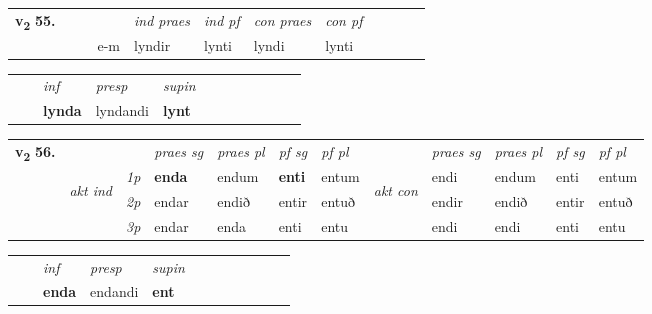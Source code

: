 \begin{tabular}{llllllllllll}\toprule
\multirow{4}{*}{{{\textbf{v{\textsubscript{2}}} \Large{\textbf{55.}}}}}  & &  & &  \textit{ind praes} & \textit{ind pf} & \textit{con praes} & \textit{con pf} \\*
&  & & e-m & lyndir & lynti & lyndi & lynti \\*
\cmidrule{5-9}
\end{tabular}


\begin{tabular}{llllllllllll}
 & & \textit{inf}     & \textit{presp} & \textit{supin}       \\*
  & & \textbf{lynda}      & lyndandi &  \textbf{lynt}   \\*
\cmidrule{1-12}
\end{tabular}



\begin{tabular}{llllllllllll} \toprule
\multirow{4}{*}{{{\textbf{v{\textsubscript{2}}} \Large{\textbf{56.}}}}}  & &   &  \textit{praes sg}  & \textit{praes pl}  &\textit{ pf sg} & \textit{pf pl} &  &  \textit{praes sg}  & \textit{praes pl}  & \textit{pf sg} & \textit{pf pl } \\*
	\cmidrule{4-7} \cmidrule{9-12}
 & \multirow{3}{*}{\begin{turn}{90}\textit{akt ind}\end{turn}} & {\textit{1p}} & \textbf{enda} & endum    & \textbf{enti} & entum & \multirow{3}{*}{\begin{turn}{90}\textit{akt con}\end{turn}} &endi & endum & enti & entum\\*
& &  {\textit{2p}} &  endar  & endið   & entir & entuð & & endir & endið & entir & entuð \\*
& &  {\textit{3p}} & endar & enda   & enti & entu & & endi & endi& enti & entu  \\*
\cmidrule{4-7} \cmidrule{9-12}
\end{tabular}


\begin{tabular}{llllllllllll}
 & & \textit{inf}     & \textit{presp} & \textit{supin}       \\*
  & & \textbf{enda}      & endandi &  \textbf{ent}   \\*
\cmidrule{1-12}
\end{tabular}



